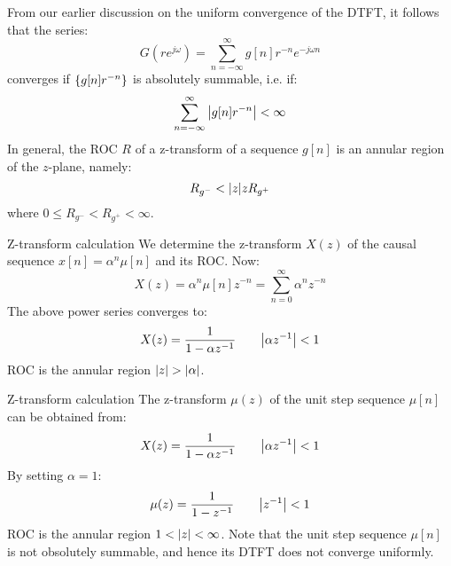 \documentclass[../../main/main.tex]{subfiles}
\begin{document}
From our earlier discussion on the uniform convergence of the DTFT, it follows that the series:
\begin{equation}
    G(re^{j\omega})
    =
    \sum_{n=-\infty}^{\infty} g[n] r^{-n} e^{-j\omega n}
    \label{eq:L14_S08_1}
\end{equation}
converges if \( \qty{g[n]r^{-n}} \) is absolutely summable, i.e. if:
\begin{equation}
    \sum_{n=-\infty}^{\infty} \abs{g[n] r^{-n}}
    <
    \infty
    \label{eq:L14_S08_2}
\end{equation}
In general, the ROC \( R \) of a z-transform of a sequence \( g[n] \) is an annular region of the \( z \)-plane, namely:
\begin{equation}
    R_{g^{-}}
    <
    \abs{z}
    z
    R_{g^{+}}
    \label{eq:L14_S09_1}
\end{equation}
where \( 0 \le R_{g^{-}} < R_{g^{+}} < \infty \).


\begin{example}{Z-transform calculation}{}
    We determine the z-transform \( X(z) \) of the causal sequence \( x[n] = \alpha^{n} \mu[n] \) and its ROC. Now:
    \begin{equation}
        X(z)
        =
        \alpha^{n} \mu[n] z^{-n}
        =
        \sum_{n=0}^{\infty} \alpha^{n} z^{-n}
        \label{eq:L14_S10_1}
    \end{equation}
    The above power series converges to:
    \begin{equation}
        X(z)
        =
        \frac{1}{1 - \alpha z^{-1}}
        \qquad
        \abs{\alpha z^{-1}} < 1
        \label{eq:L14_S10_2}
    \end{equation}
    ROC is the annular region \( \abs{z} > \abs{\alpha} \).
\end{example}

\begin{example}{Z-transform calculation}{}
    The z-transform \( \mu(z) \) of the unit step sequence \( \mu[n] \) can be obtained from:
    \begin{equation}
        X(z)
        =
        \frac{1}{1 - \alpha z^{-1}}
        \qquad
        \abs{\alpha z^{-1}} < 1
        \label{eq:L14_S11_1}
    \end{equation}
    By setting \( \alpha = 1 \):
    \begin{equation}
        \mu(z)
        =
        \frac{1}{1 - z^{-1}}
        \qquad
        \abs{z^{-1}} < 1
        \label{eq:L14_S11_2}
    \end{equation}
    ROC is the annular region \( 1 < \abs{z} < \infty \). Note that the unit step sequence \( \mu[n] \) is not obsolutely summable, and hence its DTFT does not converge uniformly.
\end{example}
\end{document}
